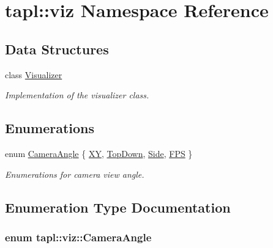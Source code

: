 \hypertarget{namespacetapl_1_1viz}{}\section{tapl\+:\+:viz Namespace Reference}
\label{namespacetapl_1_1viz}
\subsection*{Data Structures}
\begin{DoxyCompactItemize}
\item 
class \hyperlink{classtapl_1_1viz_1_1Visualizer}{Visualizer}
\begin{DoxyCompactList}\small\item\em Implementation of the visualizer class. \end{DoxyCompactList}\end{DoxyCompactItemize}
\subsection*{Enumerations}
\begin{DoxyCompactItemize}
\item 
enum \hyperlink{namespacetapl_1_1viz_a99e496921984514dbc7bcef809f50150}{Camera\+Angle} \{ \hyperlink{namespacetapl_1_1viz_a99e496921984514dbc7bcef809f50150a361bb774c1715ed6be67552bd2aac36e}{XY}, 
\hyperlink{namespacetapl_1_1viz_a99e496921984514dbc7bcef809f50150a9aa35eea1fe8f4b45a0b02a8b5048cfa}{Top\+Down}, 
\hyperlink{namespacetapl_1_1viz_a99e496921984514dbc7bcef809f50150aa268beeef2cb7c134c70cc8fc05b7045}{Side}, 
\hyperlink{namespacetapl_1_1viz_a99e496921984514dbc7bcef809f50150a85d72fbe54240f98c1ed1ccd5fe8b7d9}{F\+PS}
 \}\begin{DoxyCompactList}\small\item\em Enumerations for camera view angle. \end{DoxyCompactList}
\end{DoxyCompactItemize}


\subsection{Enumeration Type Documentation}
\subsubsection[{\texorpdfstring{Camera\+Angle}{CameraAngle}}]{\setlength{\rightskip}{0pt plus 5cm}enum {\bf tapl\+::viz\+::\+Camera\+Angle}}\hypertarget{namespacetapl_1_1viz_a99e496921984514dbc7bcef809f50150}{}\label{namespacetapl_1_1viz_a99e496921984514dbc7bcef809f50150}


